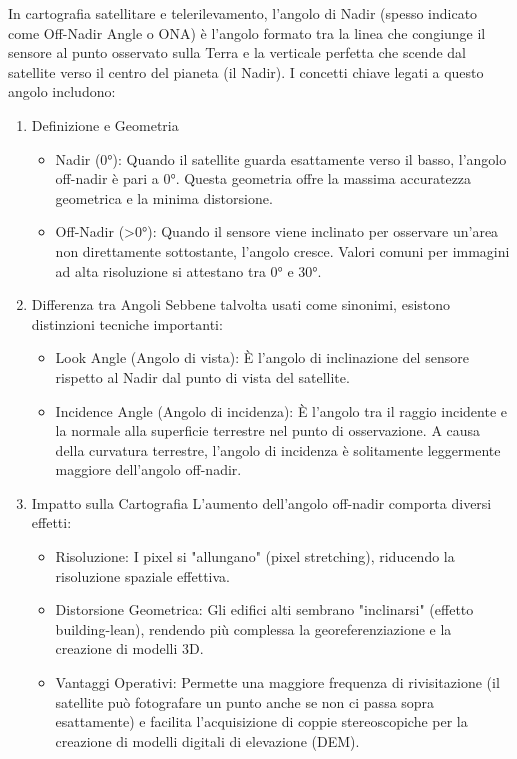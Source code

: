 \documentclass[a4paper,14pt]{article}
\begin{document}
In cartografia satellitare e telerilevamento, l'angolo di Nadir (spesso indicato come Off-Nadir Angle o ONA) è l'angolo formato tra la linea che congiunge il sensore al punto osservato sulla Terra e la verticale perfetta che scende dal satellite verso il centro del pianeta (il Nadir).
I concetti chiave legati a questo angolo includono:
\begin{enumerate}
\item Definizione e Geometria
\begin{itemize}
\item Nadir (0°): Quando il satellite guarda esattamente verso il basso, l'angolo off-nadir è pari a 0°. Questa geometria offre la massima accuratezza geometrica e la minima distorsione.
\item Off-Nadir (>0°): Quando il sensore viene inclinato per osservare un'area non direttamente sottostante, l'angolo cresce. Valori comuni per immagini ad alta risoluzione si attestano tra 0° e 30°.
\end{itemize}
\item Differenza tra Angoli
Sebbene talvolta usati come sinonimi, esistono distinzioni tecniche importanti:
\begin{itemize}
\item Look Angle (Angolo di vista):
È l'angolo di inclinazione del sensore rispetto al Nadir dal punto di vista del satellite.
\item Incidence Angle (Angolo di incidenza):
È l'angolo tra il raggio incidente e la normale alla superficie terrestre nel punto di osservazione.
A causa della curvatura terrestre, l'angolo di incidenza è solitamente leggermente maggiore dell'angolo off-nadir.
\end{itemize}
\item Impatto sulla Cartografia
L'aumento dell'angolo off-nadir comporta diversi effetti:
\begin{itemize}
\item Risoluzione: I pixel si "allungano" (pixel stretching), riducendo la risoluzione spaziale effettiva.
\item Distorsione Geometrica: Gli edifici alti sembrano "inclinarsi" (effetto building-lean), rendendo più complessa la georeferenziazione e la creazione di modelli 3D.
\item Vantaggi Operativi: Permette una maggiore frequenza di rivisitazione (il satellite può fotografare un punto anche se non ci passa sopra esattamente) e facilita l'acquisizione di coppie stereoscopiche per la creazione di modelli digitali di elevazione (DEM).

\end{itemize}
\end{enumerate}
\end{document}
